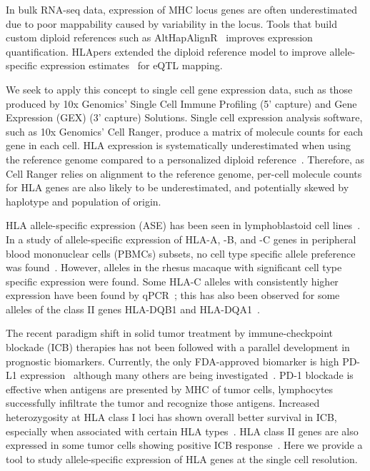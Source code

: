 \documentclass{article}[12pt]
\begin{document}
In bulk RNA-seq data, expression of MHC locus genes are often underestimated due to poor mappability caused by variability in the locus. Tools that build custom diploid references such as AltHapAlignR~\parencite{Lee2018} improves expression quantification. HLApers extended the diploid reference model to improve allele-specific expression estimates~\parencite{Aguiar2019} for eQTL mapping.

We seek to apply this concept to single cell gene expression data, such as those produced by 10x Genomics' Single Cell Immune Profiling (5' capture) and Gene Expression (GEX) (3' capture) Solutions. Single cell expression analysis software, such as 10x Genomics' Cell Ranger, produce a matrix of molecule counts for each gene in each cell. HLA expression is systematically underestimated when using the reference genome compared to a personalized diploid reference~\parencite{Aguiar2019}. Therefore, as Cell Ranger relies on alignment to the reference genome, per-cell molecule counts for HLA genes are also likely to be underestimated, and potentially skewed by haplotype and population of origin.

HLA allele-specific expression (ASE) has been seen in lymphoblastoid cell lines~\parencite{Aguiar2019}. In a study of allele-specific expression of HLA-A, -B, and -C genes in peripheral blood mononuclear cells (PBMCs) subsets, no cell type specific allele preference was found~\parencite{Greene2011}. However, alleles in the rhesus macaque with significant cell type specific expression were found. Some HLA-C alleles with consistently higher expression have been found by qPCR~\parencite{Bettens2014}; this has also been observed for some alleles of the class II genes HLA-DQB1 and HLA-DQA1~\parencite{Zajacova2018}. 

The recent paradigm shift in solid tumor treatment by immune-checkpoint blockade (ICB) therapies has not been followed with a parallel development in prognostic biomarkers. Currently, the only FDA-approved biomarker is high PD-L1 expression~\parencite{Eisenstein2017} although many others are being investigated~\parencite{Conway2018}. PD-1 blockade is effective when antigens are presented by MHC of tumor cells, lymphocytes successfully infiltrate the tumor and recognize those antigens. Increased heterozygosity at HLA class I loci has shown overall better survival in ICB, especially when associated with certain HLA types~\parencite{Chowell2018}. HLA class II genes are also expressed in some tumor cells showing positive ICB response~\parencite{Johnson2016}. Here we provide a tool to study allele-specific expression of HLA genes at the single cell resolution.
\end{document}
